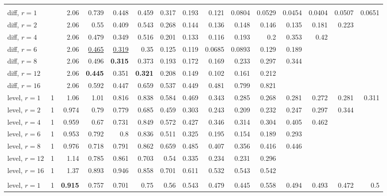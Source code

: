 \begin{table}[t]
\begin{tabular}{lrrrrrrrrrrrrrr}
\addlinespace
\multicolumn{15}{l}{\textit{Chronos-2 L-syn}} \\
\quad diff, $r{=}1$ &  & 2.06 & 0.739 & 0.448 & 0.459 & 0.317 & 0.193 & 0.121 & 0.0804 & 0.0529 & 0.0454 & 0.0404 & 0.0507 & 0.0651 \\
\quad diff, $r{=}2$ &  & 2.06 & 0.55 & 0.409 & 0.543 & 0.268 & 0.144 & 0.136 & 0.148 & 0.146 & 0.135 & 0.181 & 0.223 &  \\
\quad diff, $r{=}4$ &  & 2.06 & 0.479 & 0.349 & 0.516 & 0.201 & 0.133 & 0.116 & 0.193 & 0.2 & 0.353 & 0.42 &  &  \\
\quad diff, $r{=}6$ &  & 2.06 & \underline{0.465} & \underline{0.319} & 0.35 & 0.125 & 0.119 & 0.0685 & 0.0893 & 0.129 & 0.189 &  &  &  \\
\quad diff, $r{=}8$ &  & 2.06 & 0.496 & \textbf{0.315} & 0.373 & 0.193 & 0.172 & 0.169 & 0.233 & 0.297 & 0.344 &  &  &  \\
\quad diff, $r{=}12$ &  & 2.06 & \textbf{0.445} & 0.351 & \textbf{0.321} & 0.208 & 0.149 & 0.102 & 0.161 & 0.212 &  &  &  &  \\
\quad diff, $r{=}16$ &  & 2.06 & 0.592 & 0.447 & 0.659 & 0.537 & 0.449 & 0.481 & 0.799 & 0.821 &  &  &  &  \\
\quad level, $r{=}1$ & 1 & 1.06 & 1.01 & 0.816 & 0.838 & 0.584 & 0.469 & 0.343 & 0.285 & 0.268 & 0.281 & 0.272 & 0.281 & 0.311 \\
\quad level, $r{=}2$ & 1 & 0.974 & 0.79 & 0.779 & 0.685 & 0.459 & 0.303 & 0.243 & 0.209 & 0.232 & 0.247 & 0.297 & 0.344 &  \\
\quad level, $r{=}4$ & 1 & 0.959 & 0.67 & 0.731 & 0.849 & 0.572 & 0.427 & 0.346 & 0.314 & 0.304 & 0.405 & 0.462 &  &  \\
\quad level, $r{=}6$ & 1 & 0.953 & 0.792 & 0.8 & 0.836 & 0.511 & 0.325 & 0.195 & 0.154 & 0.189 & 0.293 &  &  &  \\
\quad level, $r{=}8$ & 1 & 0.976 & 0.718 & 0.791 & 0.862 & 0.659 & 0.485 & 0.407 & 0.356 & 0.416 & 0.446 &  &  &  \\
\quad level, $r{=}12$ & 1 & 1.14 & 0.785 & 0.861 & 0.703 & 0.54 & 0.335 & 0.234 & 0.231 & 0.296 &  &  &  &  \\
\quad level, $r{=}16$ & 1 & 1.37 & 0.893 & 0.946 & 0.858 & 0.701 & 0.611 & 0.532 & 0.543 & 0.542 &  &  &  &  \\
\addlinespace
\multicolumn{15}{l}{\textit{Chronos-2 S (level)}} \\
\quad level, $r{=}1$ & 1 & \textbf{0.915} & 0.757 & 0.701 & 0.75 & 0.56 & 0.543 & 0.479 & 0.445 & 0.558 & 0.494 & 0.493 & 0.472 & 0.5 \\

\end{tabular}
\end{table}
